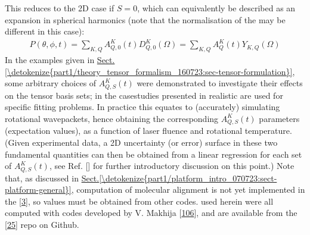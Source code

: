 \documentclass[letterpaper,table,10pt,english]{jupyterBook}
\begin{document}
\sphinxAtStartPar
This reduces to the 2D case if \(S=0\), which can equivalently be described as an expansion in spherical harmonics (note that the normalisation of the {\hyperref[\detokenize{backmatter/glossary:term-ADMs}]{}} may be different in this case):
\begin{equation}\label{equation:part1/theory_molecular_alignment_170723:eqn:P-omega-t-2D}
\begin{split} 
P(\theta,\phi,t) = \sum_{K,Q} A^K_{Q,0}(t)D^K_{Q,0}(\Omega) = \sum_{K,Q} A^K_{Q}(t)Y_{K,Q}(\Omega)
\end{split}
\end{equation}
\sphinxAtStartPar
In the examples given in \hyperref[\detokenize{part1/theory_tensor_formalism_160723:sec-tensor-formulation}]{Sect.\@ \ref{\detokenize{part1/theory_tensor_formalism_160723:sec-tensor-formulation}}}, some arbitrary choices of \(A^K_{Q,S}(t)\) were demonstrated to investigate their effects on the tensor basis sets; in the case\sphinxhyphen{}studies presented in {\hyperref[\detokenize{part2/extracting_matrix_elements_overview_270423:chpt-extracting-matrix-elements-overview}]{}} realistic {\hyperref[\detokenize{backmatter/glossary:term-ADMs}]{}} are used for specific fitting problems. In practice this equates to (accurately) simulating rotational wavepackets, hence obtaining the corresponding \(A_{Q,S}^{K}(t)\) parameters (expectation values), as a function of laser fluence and rotational temperature. (Given experimental data, a 2D uncertainty (or error) surface in these two fundamental quantities can then be obtained from a linear regression for each set of \(A_{Q,S}^{K}(t)\), see Ref. {[}{]} for further introductory discussion on this point.) Note that, as discussed in \hyperref[\detokenize{part1/platform_intro_070723:sect-platform-general}]{Sect.\@ \ref{\detokenize{part1/platform_intro_070723:sect-platform-general}}}, computation of molecular alignment is not yet implemented in the  {[}\hyperlink{cite.backmatter/bibliography:id668}{3}{]}, so values must be obtained from other codes. {\hyperref[\detokenize{backmatter/glossary:term-ADMs}]{}} used herein were all computed with codes developed by V. Makhija {[}\hyperlink{cite.backmatter/bibliography:id755}{106}{]}, and are available from the  {[}\hyperlink{cite.backmatter/bibliography:id597}{25}{]} repo on Github.
\end{document}
